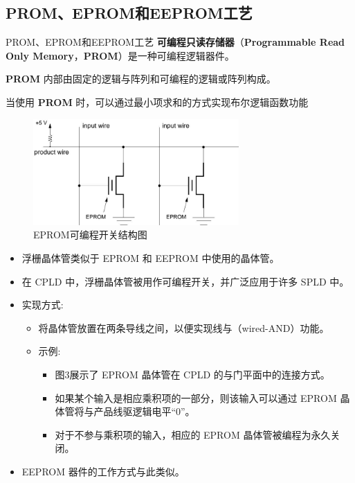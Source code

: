 \subsection{PROM、EPROM和EEPROM工艺}
\begin{frame}[allowframebreaks]{PROM、EPROM和EEPROM工艺}
\textbf{可编程只读存储器}（\textbf{Programmable Read Only
Memory}，\textbf{PROM}）是一种可编程逻辑器件。

\textbf{PROM} 内部由固定的逻辑与阵列和可编程的逻辑或阵列构成。

当使用 \textbf{PROM} 时，可以通过最小项求和的方式实现布尔逻辑函数功能

\begin{figure}
\centering
\includegraphics[width=0.7\textwidth]{img1/EPROM.jpeg}
\caption{EPROM可编程开关结构图}
\end{figure}

\begin{itemize}
\tightlist
\item
    浮栅晶体管类似于 EPROM 和 EEPROM 中使用的晶体管。
\item
    在 CPLD 中，浮栅晶体管被用作可编程开关，并广泛应用于许多 SPLD 中。
\item
    实现方式:

    \begin{itemize}
    \tightlist
    \item
    将晶体管放置在两条导线之间，以便实现线与（wired-AND）功能。
    \item
    示例:

    \begin{itemize}
    \tightlist
    \item
        图3展示了 EPROM 晶体管在 CPLD 的与门平面中的连接方式。
    \item
        如果某个输入是相应乘积项的一部分，则该输入可以通过 EPROM
        晶体管将与产品线驱逻辑电平``0''。
    \item
        对于不参与乘积项的输入，相应的 EPROM 晶体管被编程为永久关闭。
    \end{itemize}
    \end{itemize}
\item
    EEPROM 器件的工作方式与此类似。
\end{itemize}
\end{frame}

